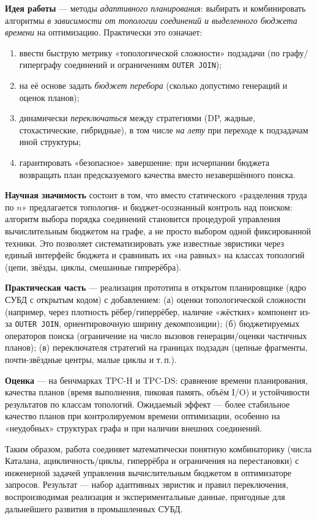 \begin{flushleft}
\textbf{Идея работы} — методы \emph{адаптивного планирования}: выбирать и комбинировать алгоритмы \emph{в зависимости от топологии соединений и выделенного бюджета времени} на оптимизацию. Практически это означает:
\begin{enumerate}
  \item ввести быструю метрику «топологической сложности» подзадачи (по графу/гиперграфу соединений и ограничениям \texttt{OUTER JOIN});
  \item на её основе задать \emph{бюджет перебора} (сколько допустимо генераций и оценок планов);
  \item динамически \emph{переключаться} между стратегиями (DP, жадные, стохастические, гибридные), в том числе \emph{на лету} при переходе к подзадачам иной структуры;
  \item гарантировать «безопасное» завершение: при исчерпании бюджета возвращать план предсказуемого качества вместо незавершённого поиска.
\end{enumerate}

\textbf{Научная значимость} состоит в том, что вместо статического «разделения труда по \(n\)» предлагается топология- и бюджет-осознанный контроль над поиском: алгоритм выбора порядка соединений становится процедурой управления вычислительным бюджетом на графе, а не просто выбором одной фиксированной техники. Это позволяет систематизировать уже известные эвристики через единый интерфейс бюджета и сравнивать их «на равных» на классах топологий (цепи, звёзды, циклы, смешанные гипрерёбра).

\textbf{Практическая часть} — реализация прототипа в открытом планировщике (ядро СУБД с открытым кодом) с добавлением: (а) оценки топологической сложности (например, через плотность рёбер/гиперрёбер, наличие «жёстких» компонент из-за \texttt{OUTER JOIN}, ориентировочную ширину декомпозиции); (б) бюджетируемых операторов поиска (ограничение на число вызовов генерации/оценки частичных планов); (в) переключателя стратегий на границах подзадач (цепные фрагменты, почти-звёздные центры, малые циклы и т.\,п.).

\textbf{Оценка} — на бенчмарках TPC-H и TPC-DS: сравнение времени планирования, качества планов (время выполнения, пиковая память, объём I/O) и устойчивости результатов по классам топологий. Ожидаемый эффект — более стабильное качество планов при контролируемом времени оптимизации, особенно на «неудобных» структурах графа и при наличии внешних соединений.

Таким образом, работа соединяет математически понятную комбинаторику (числа Каталана, ацикличность/циклы, гиперрёбра и ограничения на перестановки) с инженерной задачей управления вычислительным бюджетом в оптимизаторе запросов. Результат — набор адаптивных эвристик и правил переключения, воспроизводимая реализация и экспериментальные данные, пригодные для дальнейшего развития в промышленных СУБД.

\end{flushleft}